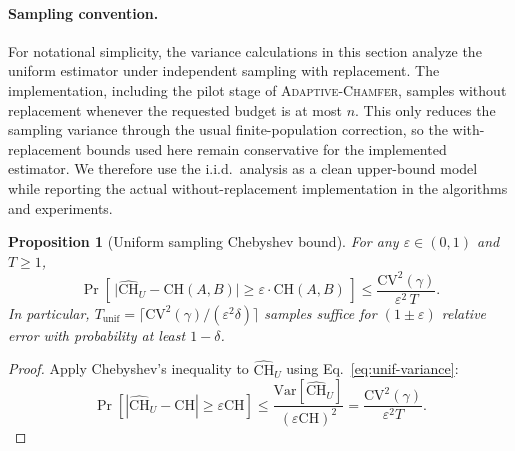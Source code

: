\documentclass[conference]{IEEEtran}
\newtheorem{proposition}{Proposition}
\begin{document}
\paragraph{Sampling convention.}
For notational simplicity, the variance calculations in this section
analyze the uniform estimator under independent sampling with replacement.
The implementation, including the pilot stage of
\textsc{Adaptive-Chamfer}, samples without replacement whenever the requested
budget is at most $n$. This only reduces the sampling variance through the
usual finite-population correction, so the with-replacement bounds used here
remain conservative for the implemented estimator. We therefore use the
i.i.d.\ analysis as a clean upper-bound model while reporting the actual
without-replacement implementation in the algorithms and experiments.

\begin{proposition}[Uniform sampling Chebyshev bound]
\label{prop:unif-cheb}
For any $\varepsilon \in (0, 1)$ and $T \geq 1$,
\begin{equation}
    \Pr\!\left[\, \big|\widehat{\mathrm{CH}}_U - \mathrm{CH}(A, B)\big|
    \geq \varepsilon \cdot \mathrm{CH}(A, B) \,\right]
    \leq \frac{\mathrm{CV}^2(\gamma)}{\varepsilon^2 \, T}.
\label{eq:unif-cheb}
\end{equation}
In particular, $T_\mathrm{unif}
= \lceil \mathrm{CV}^2(\gamma) / (\varepsilon^2 \delta) \rceil$
samples suffice for $(1 \pm \varepsilon)$ relative error with
probability at least $1 - \delta$.
\end{proposition}

\begin{proof}
Apply Chebyshev's inequality to
$\widehat{\mathrm{CH}}_U$ using
Eq.~\ref{eq:unif-variance}:
\[
\Pr\!\left[
    \left|
        \widehat{\mathrm{CH}}_U - \mathrm{CH}
    \right|
    \geq
    \varepsilon \mathrm{CH}
\right]
\leq
\frac{
    \mathrm{Var}[\widehat{\mathrm{CH}}_U]
}{
    (\varepsilon \mathrm{CH})^2
}
=
\frac{
    \mathrm{CV}^2(\gamma)
}{
    \varepsilon^2 T
}.
\]
\end{proof}
\end{document}
